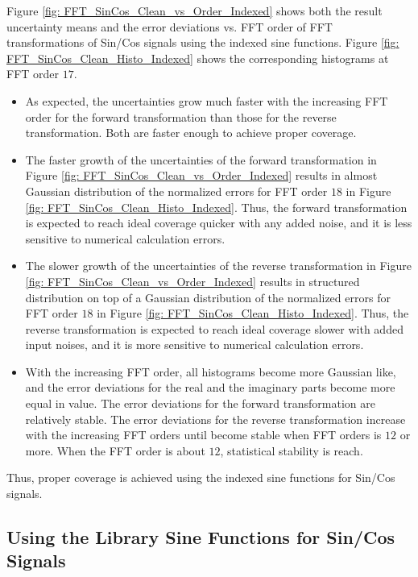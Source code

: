 \documentclass[twoside]{article}
\numberwithin{equation}{section}
\begin{document}
Figure \ref{fig: FFT_SinCos_Clean_vs_Order_Indexed} shows both the result uncertainty means and the error deviations vs. FFT order of FFT transformations of Sin/Cos signals using the indexed sine functions.
Figure \ref{fig: FFT_SinCos_Clean_Histo_Indexed} shows the corresponding histograms at FFT order $17$.
\begin{itemize}
\item As expected, the uncertainties grow much faster with the increasing FFT order for the forward transformation than those for the reverse transformation.
Both are faster enough to achieve proper coverage. 

\item The faster growth of the uncertainties of the forward transformation in Figure \ref{fig: FFT_SinCos_Clean_vs_Order_Indexed} results in almost Gaussian distribution of the normalized errors for FFT order $18$ in Figure \ref{fig: FFT_SinCos_Clean_Histo_Indexed}.
Thus, the forward transformation is expected to reach ideal coverage quicker with any added noise, and it is less sensitive to numerical calculation errors.

\item The slower growth of the uncertainties of the reverse transformation in Figure \ref{fig: FFT_SinCos_Clean_vs_Order_Indexed} results in structured distribution on top of a Gaussian distribution of the normalized errors for FFT order $18$ in Figure \ref{fig: FFT_SinCos_Clean_Histo_Indexed}.
Thus, the reverse transformation is expected to reach ideal coverage slower with added input noises, and it is more sensitive to numerical calculation errors.

\item With the increasing FFT order, all histograms become more Gaussian like, and the error deviations for the real and the imaginary parts become more equal in value.
The error deviations for the forward transformation are relatively stable.
The error deviations for the reverse transformation increase with the increasing FFT orders until become stable when FFT orders is $12$ or more.
When the FFT order is about $12$, statistical stability is reach.
 
\end{itemize}

Thus, proper coverage is achieved using the indexed sine functions for Sin/Cos signals.


\subsection{Using the Library Sine Functions for Sin/Cos Signals}
\end{document}
